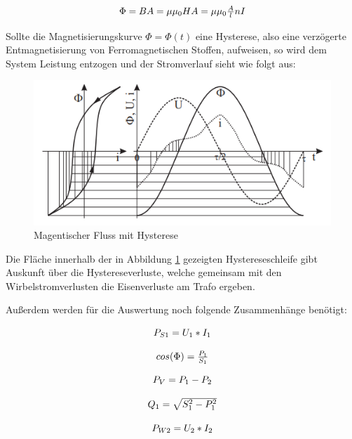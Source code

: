 \documentclass[12pt,a4paper,twoside]{article}
\begin{document}
\begin{equation}
    \label{eq:Magnetischer Fluss}
    \centerline{$\Phi = BA = \mu \mu_{0} HA = \mu \mu_{0} \frac{A}{l} nI$}
\end{equation}

\noindent
Sollte die Magnetisierungskurve $\Phi = \Phi(t)$ eine Hysterese, also eine verzögerte Entmagnetisierung von Ferromagnetischen Stoffen, aufweisen, so wird dem System Leistung entzogen und der Stromverlauf sieht wie folgt aus:

\begin{figure}[H]
    \centering
    \includegraphics[width=0.5\linewidth]{nudes/GL-Hysterese.png}
    \caption{Magentischer Fluss mit Hysterese}
    \label{fig:Hystere}
\end{figure}

\noindent
Die Fläche innerhalb der in Abbildung \ref{fig:Hystere} gezeigten Hystereseschleife gibt Auskunft über die Hystereseverluste, welche gemeinsam mit den Wirbelstromverlusten die Eisenverluste am Trafo ergeben. \newline

\noindent
Außerdem werden für die Auswertung noch folgende Zusammenhänge benötigt:

\begin{equation}
    \label{eq:Scheinleistung}
    \centerline{$P_{S1} = U_{1}*I_{1}$}
\end{equation}

\begin{equation}
    \label{eq:Leistungsfaktor}
    \centerline{$cos(\Phi) = \frac{P_{1}}{S_{1}}$}
\end{equation}

\begin{equation}
    \label{eq:Verlustleistung}
    \centerline{$P_{V} = P_{1} - P_{2}$}
\end{equation}

\begin{equation}
    \label{eq:Blindleistung}
    \centerline{$Q_{1} = \sqrt{S_{1}^2 - P_{1}^2}$}
\end{equation}

\begin{equation}
    \label{eq:Wirkleistung}
    \centerline{$P_{W2} = U_{2}*I_{2}$}
\end{equation}
\end{document}
